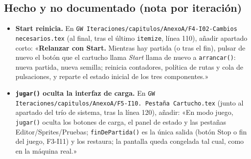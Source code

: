 \subsection{Hecho y no documentado (nota por iteración)}
\label{sec:F5I16Hecho}

\begin{itemize}
\item \textbf{Start reinicia.} En
\texttt{GW Iteraciones/capitulos/AnexoA/F4-I02-Cambios necesarios.tex}
(al final, tras el último \texttt{itemize}, línea 110), añadir
apartado corto: «\textbf{Relanzar con Start.} Mientras hay partida
(o tras el fin), pulsar de nuevo el botón que el cartucho llama
\emph{Start} llama de nuevo a \texttt{arrancar()}: nueva partida,
nueva semilla; reinicia contadores, política de rutas y cola de
pulsaciones, y reparte el estado inicial de los tres
componentes.»
\item \textbf{\texttt{jugar()} oculta la interfaz de carga.} En
\texttt{GW Iteraciones/capitulos/AnexoA/F5-I10. Pestaña
Cartucho.tex} (junto al apartado del trío de sistema, tras la
línea 120), añadir: «En modo juego, \texttt{jugar()} oculta los
botones de carga, el panel de estado y las pestañas
Editor/Sprites/Pruebas; \texttt{finDePartida()} es la única salida
(botón Stop o fin del juego, F3-I11) y los restaura; la pantalla
queda congelada tal cual, como en la máquina real.»
\end{itemize}

